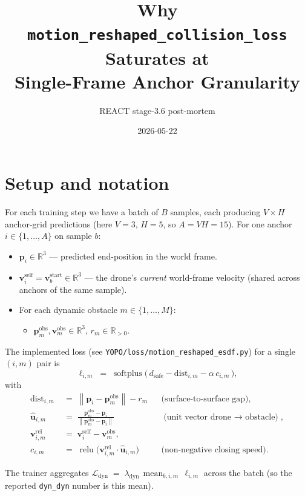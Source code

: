 \documentclass[11pt]{article}
\title{Why \texttt{motion\_reshaped\_collision\_loss} Saturates at\\Single-Frame Anchor Granularity}
\author{REACT stage-3.6 post-mortem}
\date{2026-05-22}
\newcommand{\R}{\mathbb{R}}
\newcommand{\Norm}[1]{\left\lVert #1 \right\rVert}
\newcommand{\relu}{\operatorname{relu}}
\newcommand{\softplus}{\operatorname{softplus}}
\begin{document}
\maketitle

\section{Setup and notation}

For each training step we have a batch of $B$ samples, each producing $V \times H$
anchor-grid predictions (here $V=3$, $H=5$, so $A = V H = 15$). For one anchor
$i \in \{1, \dots, A\}$ on sample $b$:
\begin{itemize}
  \item $\bm{p}_i \in \R^3$ --- predicted end-position in the world frame.
  \item $\bm{v}_i^{\text{self}} = \bm{v}_b^{\text{start}} \in \R^3$ --- the
        drone's \emph{current} world-frame velocity (shared across anchors of
        the same sample).
  \item For each dynamic obstacle $m \in \{1, \dots, M\}$:
    \begin{itemize}
      \item $\bm{p}_m^{\text{obs}}, \bm{v}_m^{\text{obs}} \in \R^3$, $r_m \in \R_{>0}$.
    \end{itemize}
\end{itemize}

The implemented loss (see \texttt{YOPO/loss/motion\_reshaped\_esdf.py}) for a single
$(i, m)$ pair is
\begin{equation}\label{eq:loss}
\ell_{i,m} \;=\;
\softplus\!\bigl(\,d_{\text{safe}} - \mathrm{dist}_{i,m} - \alpha\, c_{i,m}\,\bigr),
\end{equation}
with
\begin{align}
\mathrm{dist}_{i,m} &\;=\; \Norm{\bm{p}_i - \bm{p}_m^{\text{obs}}} - r_m
  &&\text{(surface-to-surface gap)},\\
\hat{\bm{u}}_{i,m} &\;=\; \frac{\bm{p}_m^{\text{obs}} - \bm{p}_i}{\Norm{\bm{p}_m^{\text{obs}} - \bm{p}_i}}
  &&\text{(unit vector drone $\to$ obstacle)},\\
\bm{v}_{i,m}^{\text{rel}} &\;=\; \bm{v}_i^{\text{self}} - \bm{v}_m^{\text{obs}},\\
c_{i,m} &\;=\; \relu\!\bigl(\bm{v}_{i,m}^{\text{rel}} \cdot \hat{\bm{u}}_{i,m}\bigr)
  &&\text{(non-negative closing speed)}.\label{eq:closing}
\end{align}

The trainer aggregates
\(
\mathcal{L}_{\text{dyn}} \;=\; \lambda_{\text{dyn}}\,
\operatorname*{mean}_{b, i, m}\, \ell_{i,m}
\)
across the batch (so the reported \texttt{dyn\_dyn} number is this mean).
\end{document}
